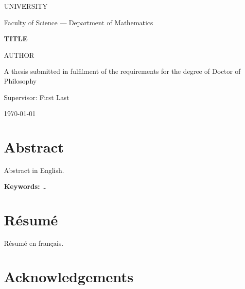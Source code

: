 \documentclass[12pt,oneside]{report}
\theoremstyle{plain}
\theoremstyle{definition}
\theoremstyle{remark}
\begin{document}
\begin{titlepage}
  \centering
  {\large UNIVERSITY\par}
  {\large Faculty of Science — Department of Mathematics\par}
  \vspace{3cm}
  {\LARGE\bfseries {{TITLE}}\par}
  \vspace{2cm}
  {\Large {{AUTHOR}}\par}
  \vspace{1.5cm}
  A thesis submitted in fulfilment of the requirements for the degree of Doctor of Philosophy\par
  \vfill
  {\large Supervisor: First Last\par}
  \vspace{1cm}
  {\large \today\par}
\end{titlepage}

\chapter*{Abstract}
Abstract in English.

\textbf{Keywords:} \dots

\chapter*{Résumé}
\begin{otherlanguage}{french}Résumé en français.\end{otherlanguage}

\chapter*{Acknowledgements}

\tableofcontents
\listoffigures

\cleardoublepage
{}





\appendix




\end{document}

